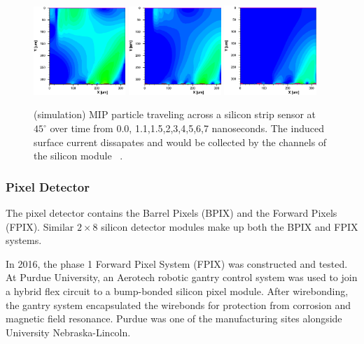 \begin{figure}[ht!b]
  \includegraphics[width=0.31\textwidth]{figures/silicon/silicon_t5.0.png}
  \includegraphics[width=0.31\textwidth]{figures/silicon/silicon_t6.0.png}
  \includegraphics[width=0.31\textwidth]{figures/silicon/silicon_t7.0.png}\\
    \caption{\label{fig:sd} (simulation) MIP particle traveling across a silicon strip sensor at $45^\circ$ over time from 0.0, 1.1,1.5,2,3,4,5,6,7 nanoseconds. The induced surface current dissapates and would be collected by the channels of the silicon module ~\cite{Eichhorn:2112017}.}
\end{figure}





\subsubsection{Pixel Detector}
\label{sec:pixeldet}
The pixel detector contains the Barrel Pixels (BPIX) and the Forward Pixels (FPIX).  
Similar $2\times8$ silicon detector modules make up both the BPIX and FPIX systems.

In 2016, the phase 1 Forward Pixel System (FPIX) was constructed and tested. At Purdue University, an Aerotech robotic gantry control system was used to join a hybrid flex circuit to a bump-bonded silicon pixel module. After wirebonding, the gantry system encapsulated the wirebonds for protection from corrosion and magnetic field resonance. Purdue was one of the manufacturing sites alongside University Nebraska-Lincoln. 

